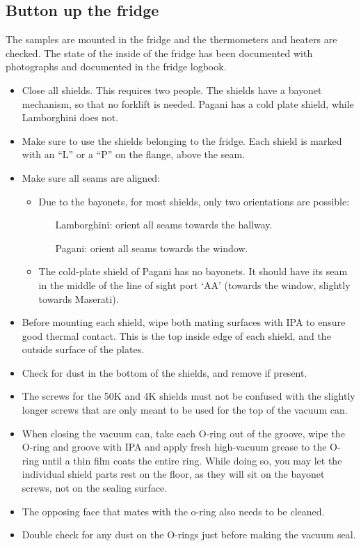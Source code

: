 \documentclass{article}[18pt,A4]
\begin{document}
\subsection{Button up the fridge}
The samples are mounted in the fridge and the thermometers and heaters are checked.
The state of the inside of the fridge has been documented with photographs and documented in the fridge logbook.
\begin{itemize}
    \item Close all shields. This requires two people. The shields have a bayonet mechanism, so that no forklift is needed.
    Pagani has a cold plate shield, while Lamborghini does not.
    \item Make sure to use the shields belonging to the fridge. Each shield is marked with an ``L'' or a ``P'' on the flange, above the seam.
    \item Make sure all seams are aligned:
        \begin{itemize}
        \item Due to the bayonets, for most shields, only two orientations are possible: 
            \begin{itemize}
            \item[Lamborghini:] orient all seams towards the hallway. 
            \item[Pagani:] orient all seams towards the window. 
            \end{itemize}
        \item The cold-plate shield of Pagani has no bayonets. It should have its seam in the middle of the line of sight port `AA' (towards the window, slightly towards Maserati).
        \end{itemize}
    \item Before mounting each shield, wipe both mating surfaces with IPA to ensure good thermal contact. 
    This is the top inside edge of each shield, and the outside surface of the plates.
    \item Check for dust in the bottom of the shields, and remove if present.
    \item The screws for the 50K and 4K shields must not be confused with the slightly longer screws that are only meant to be used for the top of the vacuum can.
    \item When closing the vacuum can, take each O-ring out of the groove, wipe the O-ring and groove with IPA and apply fresh high-vacuum grease to the O-ring until a thin
    film coats the entire ring.
    While doing so, you may let the individual shield parts rest on the floor, as they will sit on the bayonet screws, not on the sealing surface.
    \item The opposing face that mates with the o-ring also needs to be cleaned.
    \item Double check for any dust on the O-rings just before making the vacuum seal.
\end{itemize}
\end{document}
